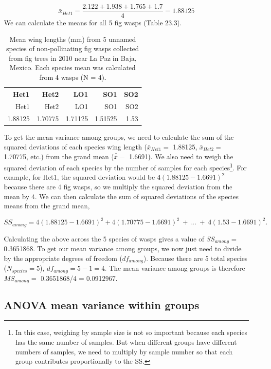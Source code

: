 \documentclass[
]{scrbook}
\begin{document}
\[\bar{x}_{Het1} = \frac{2.122 + 1.938 + 1.765 + 1.7}{4} = 1.88125\]
We can calculate the means for all 5 fig wasps (Table 23.3).

\begin{longtable}[]{@{}rrrrr@{}}
\caption{\label{tab:unnamed-chunk-109}Mean wing lengths (mm) from 5 unnamed species of non-pollinating fig wasps collected from fig trees in 2010 near La Paz in Baja, Mexico. Each species mean was calculated from 4 wasps (N = 4).}\tabularnewline
\toprule
Het1 & Het2 & LO1 & SO1 & SO2 \\
\midrule
\endfirsthead
\toprule
Het1 & Het2 & LO1 & SO1 & SO2 \\
\midrule
\endhead
1.88125 & 1.70775 & 1.71125 & 1.51525 & 1.53 \\
\bottomrule
\end{longtable}

To get the mean variance among groups, we need to calculate the sum of the squared deviations of each species wing length (\(\bar{x}_{Het1} =\) 1.88125, \(\bar{x}_{Het2} =\) 1.70775, etc.) from the grand mean (\(\bar{\bar{x}} =\) 1.6691).
We also need to weigh the squared deviation of each species by the number of samples for each species\footnote{In this case, weighing by sample size is not so important because each species has the same number of samples. But when different groups have different numbers of samples, we need to multiply by sample number so that each group contributes proportionally to the SS.}.
For example, for Het1, the squared deviation would be \(4(1.88125 - 1.6691)^{2}\) because there are 4 fig wasps, so we multiply the squared deviation from the mean by 4.
We can then calculate the sum of squared deviations of the species means from the grand mean,

\[SS_{among} = 4(1.88125 - 1.6691)^{2} + 
               4(1.70775 - 1.6691)^{2}\:+\: ... \:
               +\:4(1.53 - 1.6691)^{2}.\]

Calculating the above across the 5 species of wasps gives a value of \(SS_{among} =\) 0.3651868.
To get our mean variance among groups, we now just need to divide by the appropriate degrees of freedom (\(df_{among}\)).
Because there are 5 total species (\(N_{species} = 5\)), \(df_{among} = 5 - 1 = 4\).
The mean variance among groups is therefore \(MS_{among} =\) 0.3651868/4 = 0.0912967.

\hypertarget{anova-mean-variance-within-groups}{%
\subsection{ANOVA mean variance within groups}\label{anova-mean-variance-within-groups}}
\end{document}
